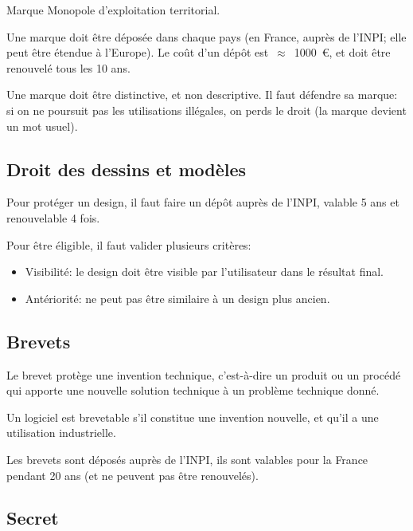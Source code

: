 \documentclass[10pt,a4paper,french]{article}
\begin{document}
\begin{cquote}{Marque}
Monopole d'exploitation territorial.
\end{cquote}

Une marque doit être déposée dans chaque pays (en France, auprès de l'INPI; elle peut être étendue à l'Europe). Le coût d'un dépôt est~$\approx$~1000~\euro, et doit être renouvelé tous les 10 ans.

Une marque doit être distinctive, et non descriptive. Il faut défendre sa marque: si on ne poursuit pas les utilisations illégales, on perds le droit (la marque devient un mot usuel).

\subsection{Droit des dessins et modèles}

Pour protéger un design, il faut faire un dépôt auprès de l'INPI, valable 5 ans et renouvelable 4 fois.

Pour être éligible, il faut valider plusieurs critères:
\begin{itemize}
\item Visibilité: le design doit être visible par l'utilisateur dans le résultat final.
\item Antériorité: ne peut pas être similaire à un design plus ancien.
\end{itemize}

\subsection{Brevets}

\begin{cquote}{}
Le brevet protège une invention technique, c'est-à-dire un produit ou un procédé qui apporte une nouvelle solution technique à un problème technique donné.
\end{cquote}

Un logiciel est brevetable s'il constitue une invention nouvelle, et qu'il a une utilisation industrielle.

Les brevets sont déposés auprès de l'INPI, ils sont valables pour la France pendant 20 ans (et ne peuvent pas être renouvelés).

\subsection{Secret}
\end{document}

